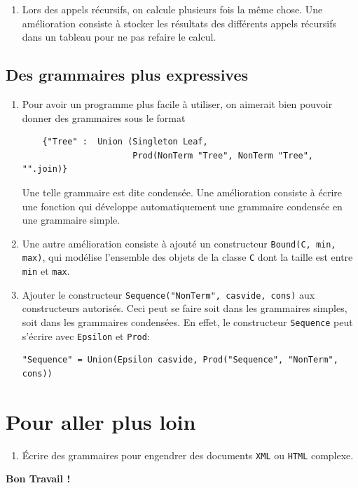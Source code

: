 \documentclass[11pt]{article}
\newcounter{asuivre}
\newenvironment{asks}{\begin{enumerate}\setcounter{enumi}{\theasuivre}}%
                       {\setcounter{asuivre}{\theenumi}\end{enumerate}}
\begin{document}
\begin{asks}
\item Lors des appels récursifs, on calcule plusieurs fois la même chose. Une
  amélioration consiste à stocker les résultats des différents appels
  récursifs dans un tableau pour ne pas refaire le calcul.
\end{asks}

\subsection{Des grammaires plus expressives}

\begin{asks}
\item Pour avoir un programme plus facile à utiliser, on aimerait bien pouvoir
  donner des grammaires sous le format
\begin{verbatim}
    {"Tree" :  Union (Singleton Leaf,
                      Prod(NonTerm "Tree", NonTerm "Tree", "".join)}
\end{verbatim}
  Une telle grammaire est dite condensée. Une amélioration consiste à écrire
  une fonction qui développe automatiquement une grammaire
  condensée en une grammaire simple.
\item Une autre amélioration consiste à ajouté un constructeur
  \texttt{Bound(C, min, max)}, qui modélise l'ensemble des objets de la classe
  \texttt{C} dont la taille est entre \texttt{min} et \texttt{max}.
\item Ajouter le constructeur \texttt{Sequence("NonTerm", casvide, cons)} aux
  constructeurs autorisés. Ceci peut se faire soit dans les grammaires
  simples, soit dans les grammaires condensées.  En effet, le constructeur
  \texttt{Sequence} peut s'écrire avec \texttt{Epsilon} et \texttt{Prod}:
\begin{verbatim}
"Sequence" = Union(Epsilon casvide, Prod("Sequence", "NonTerm", cons))
\end{verbatim}
\end{asks}

\section{Pour aller plus loin}

\begin{asks}
\item Écrire des grammaires pour engendrer des documents \texttt{XML} ou
  \texttt{HTML} complexe.
\end{asks}
\bigskip
\bigskip
\bigskip
\hskip10cm{\Large\bf Bon Travail !}
\end{document}

